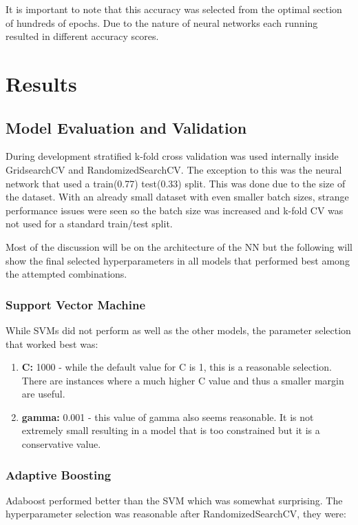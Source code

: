 \documentclass[11pt]{article}
\begin{document}
	It is important to note that this accuracy was selected from the optimal section of hundreds of epochs. Due to the nature of neural networks each running resulted in different accuracy scores.
	
	\section{Results}
	\subsection{Model Evaluation and Validation}
	During development stratified k-fold cross validation was used internally inside GridsearchCV and RandomizedSearchCV. The exception to this was the neural network that used a train(0.77) test(0.33) split. This was done due to the size of the dataset. With an already small dataset with even smaller batch sizes, strange performance issues were seen so the batch size was increased and k-fold CV was not used for a standard train/test split.
	
	Most of the discussion will be on the architecture of the NN but the following will show the final selected hyperparameters in all models that performed best among the attempted combinations.
	
	\subsubsection{Support Vector Machine}
	While SVMs did not perform as well as the other models, the parameter selection that worked best was:
	
	\begin{enumerate}
		\item \textbf{C:} 1000 - while the default value for C is 1, this is a reasonable selection. There are instances where a much higher C value and thus a smaller margin are useful.
		\item \textbf{gamma:} 0.001 - this value of gamma also seems reasonable. It is not extremely small resulting in a model that is too constrained but it is a conservative value.
	\end{enumerate}
	
	\subsubsection{Adaptive Boosting}
	Adaboost performed better than the SVM which was somewhat surprising. The hyperparameter selection was reasonable after RandomizedSearchCV, they were:
\end{document}
